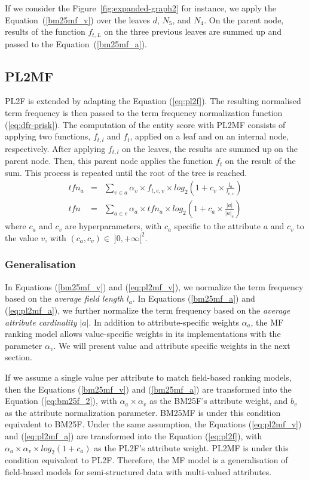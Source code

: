 If we consider the Figure~\ref{fig:expanded-graph2} for instance, we apply the Equation~(\ref{bm25mf_v}) over the leaves $d$, $N_5$, and $N_4$. On the parent node, results of the function $f_{t,L}$ on the three previous leaves are summed up and passed to the Equation~(\ref{bm25mf_a}).

\subsection{PL2MF}

PL2F is extended by adapting the Equation (\ref{eq:pl2f}). The resulting normalised term frequency is then passed to the term frequency normalization function (\ref{eq:dfr-prisk}).
The computation of the entity score with PL2MF consists of applying two functions, $f_{t,l}$ and $f_t$, applied on a leaf and on an internal node, respectively. After applying $f_{t,l}$ on the leaves, the results are summed up on the parent node. Then, this parent node applies the function $f_t$ on the result of the sum. This process is repeated until the root of the tree is reached.
\begin{eqnarray}
  \label{eq:pl2mf_v}
  tfn_a & = & \sum_{v\in a}{\alpha_v\times f_{t,e,v} \times log_2\left(1+c_v\times\frac{l_a}{l_{e,v}}\right)}\\
  \label{eq:pl2mf_a}
  tfn & = & \sum_{a\in e}{\alpha_a\times tfn_a \times log_2\left(1+c_a\times\frac{\left|{a}\right|}{\left|{a}\right|_e}\right)}
\end{eqnarray}
where $c_a$ and $c_v$ are hyperparameters, with $c_a$ specific to the attribute $a$ and $c_v$ to the value $v$, with $(c_a,c_v) \in\; ]0,+\infty[^2$.

\subsubsection{Generalisation}

In Equations (\ref{bm25mf_v}) and (\ref{eq:pl2mf_v}), we normalize the term frequency based on the \emph{average field length} $l_a$. In Equations (\ref{bm25mf_a}) and (\ref{eq:pl2mf_a}), we further normalize the term frequency based on the \emph{average attribute cardinality} $\left|{a}\right|$.
In addition to attribute-specific weights $\alpha_a$, the MF ranking model allows value-specific weights in its implementations with the parameter $\alpha_v$. We will present value and attribute specific weights in the next section.

If we assume a single value per attribute to match field-based ranking models, then the Equations (\ref{bm25mf_v}) and (\ref{bm25mf_a}) are transformed into the Equation (\ref{eq:bm25f_2}), with $\alpha_a\times\alpha_v$ as the BM25F's attribute weight, and $b_v$ as the attribute normalization parameter. BM25MF is under this condition equivalent to BM25F. Under the same assumption, the Equations (\ref{eq:pl2mf_v}) and (\ref{eq:pl2mf_a}) are transformed into the Equation (\ref{eq:pl2f}), with $\alpha_a\times\alpha_v\times log_2(1+c_a)$ as the PL2F's attribute weight. PL2MF is under this condition equivalent to PL2F. Therefore, the MF model is a generalisation of field-based models for semi-structured data with multi-valued attributes.
